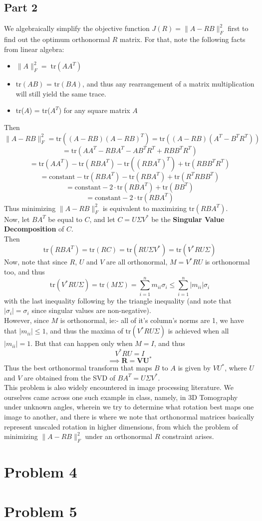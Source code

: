 \documentclass[a4paper,14pt]{article}
\numberwithin{definition}{section}
\numberwithin{mytheorem}{subsection}
\begin{document}
\subsection{Part 2}
We algebraically simplify the objective function $J(R) = \lVert A - RB\rVert^2_F$ first to find out the optimum orthonormal $R$ matrix. For that, note the following facts from linear algebra:
\begin{itemize}
    \item $\lVert A\rVert^2_F = \;$tr$(AA^T)$
    \item tr$(AB)$ = tr$(BA)$, and thus any rearrangement of a matrix multiplication will still yield the same trace.
    \item tr($A$) = tr($A^T$) for any square matrix $A$
\end{itemize}
Then 
$$\lVert A - RB\rVert^2_F = \mathrm{tr}((A - RB)(A - RB)^T) = \mathrm{tr}((A - RB)(A^T - B^TR^T))$$
$$ = \mathrm{tr}(AA^T - RBA^T - AB^TR^T + RBB^TR^T)$$
$$ = \mathrm{tr}(AA^T) - \mathrm{tr}(RBA^T) - \mathrm{tr}((RBA^T)^T) + \mathrm{tr}(RBB^TR^T)$$
$$ = \mathrm{constant} - \mathrm{tr}(RBA^T) - \mathrm{tr}(RBA^T) + \mathrm{tr}(R^TRBB^T)$$
$$ = \mathrm{constant} - 2\cdot\mathrm{tr}(RBA^T) + \mathrm{tr}(BB^T)$$
$$ = \mathrm{constant} - 2\cdot\mathrm{tr}(RBA^T)$$
Thus minimizing $\lVert A - RB\rVert^2_F$ is equivalent to maximizing $\mathrm{tr}(RBA^T)$. \\
Now, let $BA^T$ be equal to $C$, and let $C = U\Sigma V^*$ be the \textbf{Singular Value Decomposition} of $C$.\\
Then
$$\mathrm{tr}(RBA^T) = \mathrm{tr}(RC) = \mathrm{tr}(RU\Sigma V^*) = \mathrm{tr}(V^*RU\Sigma)$$
Now, note that since $R$, $U$ and $V$ are all orthonormal, $M = V^*RU$ is orthonormal too, and thus 
$$\mathrm{tr}(V^*RU\Sigma) = \mathrm{tr}(M\Sigma) = \sum^{n}_{i = 1} m_{ii}\sigma_i\leq\sum^{n}_{i = 1} |m_{ii}|\sigma_i$$
with the last inequality following by the triangle inequality (and note that $|\sigma_i| = \sigma_i$ since singular values are non-negative).\\
However, since $M$ is orthonormal, ie:- all of it's column's norms are 1, we have that $|m_{ii}|\leq 1$, and thus the maxima of $\mathrm{tr}(V^*RU\Sigma)$ is achieved when all $|m_{ii}| = 1$. But that can happen only when $M = I$, and thus
$$V^*RU = I $$
$$\boldsymbol{\implies R = VU^*}$$
Thus the best orthonormal transform that maps $B$ to $A$ is given by $VU^*$, where $U$ and $V$ are obtained from the SVD of $BA^T = U\Sigma V^*$.\\
This problem is also widely encountered in image processing literature. We ourselves came across one such example in class, namely, in 3D Tomography under unknown angles, wherein we try to determine what rotation best maps one image to another, and there is where we note that orthonormal matrices basically represent unscaled rotation in higher dimensions, from which the problem of minimizing $\lVert A - RB\rVert^2_F$ under an orthonormal $R$ constraint arises.
\section{Problem 4}
\section{Problem 5}
\end{document}
